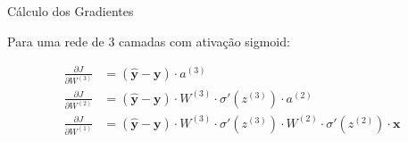 \documentclass[xcolor=dvipsnames,t,aspectratio=169]{beamer}
\begin{document}
\begin{frame}[c]{Cálculo dos Gradientes}
    \begin{display}
        Para uma rede de 3 camadas com ativação sigmoid:
        
        \vspace{0.3cm}
        \begin{align}
            \frac{\partial J}{\partial W^{(3)}} &= (\hat{\mathbf{y}} - \mathbf{y}) \cdot a^{(3)} \\[0.5em]
            \frac{\partial J}{\partial W^{(2)}} &= (\hat{\mathbf{y}} - \mathbf{y}) \cdot W^{(3)} \cdot \sigma'(z^{(3)}) \cdot a^{(2)} \\[0.5em]
            \frac{\partial J}{\partial W^{(1)}} &= (\hat{\mathbf{y}} - \mathbf{y}) \cdot W^{(3)} \cdot \sigma'(z^{(3)}) \cdot W^{(2)} \cdot \sigma'(z^{(2)}) \cdot \mathbf{x}
        \end{align}
    \end{display}
    
\end{frame}
\end{document}
